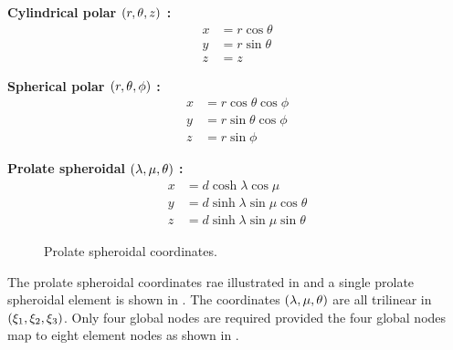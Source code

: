 \begin{description}
\item \textbf{Cylindrical polar $\left( r,\theta, z \right)$ :} 
  \begin{equation}
    \begin{split}
      x & = r \cos\theta \\
      y & = r \sin\theta \\
      z & = z 
    \end{split}
  \end{equation}

\item \textbf{Spherical polar $\left( r,\theta, \phi \right)$ :}
  \begin{equation}
    \begin{split}
      x & = r \cos\theta \cos\phi \\
      y & = r \sin\theta \cos\phi \\
      z & = r \sin\phi 
    \end{split}
  \end{equation}
  
\item \textbf{Prolate spheroidal $\left( \lambda, \mu, \theta \right)$ :}
  \begin{equation}
    \begin{split}
      x & = d \cosh\lambda \cos\mu \\ 
      y & = d \sinh\lambda \sin\mu \cos\theta \\ 
      z & = d \sinh\lambda \sin\mu \sin\theta 
    \end{split}
  \end{equation}
\end{description}


\begin{figure}[htbp] \centering
  
  \caption{Prolate spheroidal coordinates.}
  \label{fig:psc}
\end{figure}


The prolate spheroidal coordinates rae illustrated in  and a single prolate spheroidal element is shown in . The
coordinates $\left( \lambda, \mu, \theta \right)$ are all trilinear in
$\left( \xi_{1},\xi_{2},\xi_{3} \right)$.  Only four global nodes are required provided
the four global nodes map to eight element nodes as shown in .

